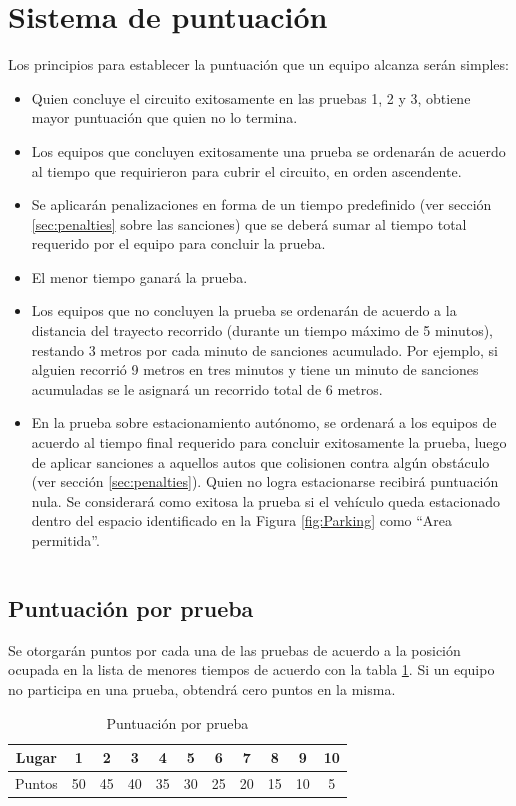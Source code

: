 \documentclass[letterpaper,12pt]{article}
\begin{document}
\section{Sistema de puntuación}
Los principios para establecer la puntuación que un equipo alcanza serán simples:
\begin{itemize}
\item Quien concluye el circuito exitosamente en las pruebas 1, 2 y 3, obtiene mayor puntuación que quien no lo termina.
\item Los equipos que concluyen exitosamente una prueba se ordenarán de acuerdo al tiempo que requirieron para cubrir el circuito, en orden ascendente.
\item Se aplicarán penalizaciones en forma de un tiempo predefinido (ver sección \ref{sec:penalties} sobre las sanciones) que se deberá sumar al tiempo total requerido por el equipo para concluir la prueba. 
\item El menor tiempo ganará la prueba.
\item Los equipos que no concluyen la prueba se ordenarán de acuerdo a la distancia del trayecto recorrido (durante un tiempo máximo de 5 minutos), restando 3 metros por cada minuto de sanciones acumulado. Por ejemplo, si alguien recorrió 9 metros en tres minutos y tiene un minuto de sanciones acumuladas se le asignará un recorrido total de 6 metros.
\item En la prueba sobre estacionamiento autónomo, se ordenará a los equipos de acuerdo al tiempo final requerido para concluir exitosamente la prueba, luego de aplicar sanciones a aquellos autos que colisionen contra algún obstáculo (ver sección \ref{sec:penalties}). Quien no logra estacionarse recibirá puntuación nula. Se considerará como exitosa la prueba si el vehículo queda estacionado dentro del espacio identificado en la Figura \ref{fig:Parking} como “Area permitida”.
\end{itemize}
\[\]
\[\]
\[\]
\subsection{Puntuación por prueba}
\label{sec:scoring}
Se otorgarán puntos por cada una de las pruebas de acuerdo a la posición ocupada en la lista de menores tiempos de acuerdo con la tabla \ref{tab:Scoring}. Si un equipo no participa en una prueba, obtendrá cero puntos en la misma.

\begin{table}[h!] 
  \centering
  \begin{tabular}{|c|c|c|c|c|c|c|c|c|c|c|}
    \hline
    Lugar &    1&   2&   3&   4&   5&   6&   7&   8&   9&10\\
    \hline
    Puntos & 50 & 45 & 40 & 35 & 30 & 25 & 20 & 15 & 10 & 5\\
    \hline
  \end{tabular}
  \caption{Puntuación por prueba}
  \label{tab:Scoring}
\end{table}
\end{document}
